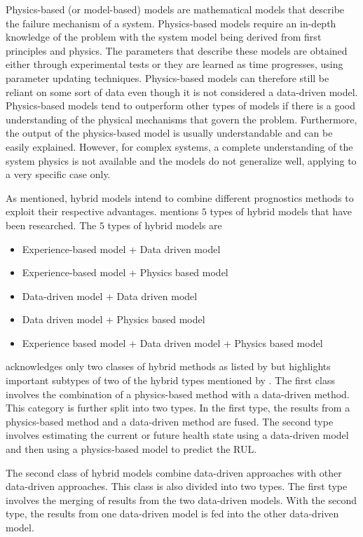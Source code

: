 Physics-based (or model-based) models are mathematical models that describe the failure mechanism of a system. Physics-based models require an in-depth knowledge of the problem with the system model being derived from first principles and physics. The parameters that describe these models are obtained either through experimental tests or they are learned as time progresses, using parameter updating techniques. Physics-based models can therefore still be reliant on some sort of data even though it is not considered a data-driven model. Physics-based models tend to outperform other types of models if there is a good understanding of the physical mechanisms that govern the problem. Furthermore, the output of the physics-based model is usually understandable and can be easily explained. However, for complex systems, a complete understanding of the system physics is not available and the models do not generalize well, applying to a very specific case only. 


As mentioned, hybrid models intend to combine different prognostics methods to exploit their respective advantages. \cite{Liao2014} mentions $5$ types of hybrid models that have been researched. The $5$ types of hybrid models are

\begin{itemize}
	\item Experience-based model + Data driven model
	\item Experience-based model + Physics based model
	\item Data-driven model + Data driven model
	\item Data driven model + Physics based model
	\item Experience based model + Data driven model + Physics based model
\end{itemize}


\cite{Xia2018} acknowledges only two classes of hybrid methods as listed by \cite{Liao2014} but highlights important subtypes of two of the hybrid types mentioned by \cite{Liao2014}. The first class involves the combination of a physics-based method with a data-driven method. This category is further split into two types. In the first type, the results from a physics-based method and a data-driven method are fused. The second type involves estimating the current or future health state using a data-driven model and then using a physics-based model to predict the RUL. 

The second class of hybrid models combine data-driven approaches with other data-driven approaches. This class is also divided into two types. The first type involves the merging of results from the two data-driven models. With the second type, the results from one data-driven model is fed into the other data-driven model.

